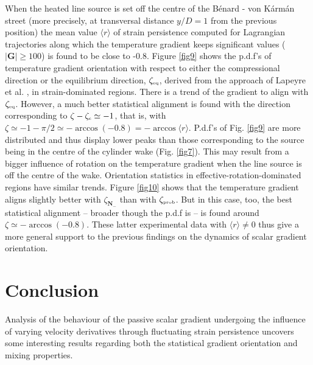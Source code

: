 \documentclass[doublespacing]{elsart}
\begin{document}
When the heated line source is set off the centre of
the B\'enard - von K\'arm\'an street (more precisely, at
transversal distance
$ y/D = 1 $ from the 
previous position) the mean value $ \langle r \rangle $ of
strain persistence computed for Lagrangian trajectories 
along which
the temperature gradient keeps significant values 
($ |\bm{G}| \geq 100 $)
is
found to be close to -0.8. 
Figure \ref{fig9} shows the p.d.f's of temperature gradient 
orientation with respect to either the compressional 
direction
or the equilibrium
direction, $ \zeta_{\mbox{\tiny eq}} $, derived from the approach
of Lapeyre et al. \cite{Lal99},
in strain-dominated regions.
There is a trend 
of the gradient
to
align with $ \zeta_{\mbox{\tiny eq}} $. However, a much better
statistical alignment is found with the direction corresponding
to $ \zeta - \zeta_{\mbox{\tiny c}} \simeq -1 $, that is, with
$ \zeta \simeq -1-\pi/2 \simeq -\arccos(-0.8) = -\arccos \langle r \rangle $.
P.d.f's of Fig. \ref{fig9} are more distributed and thus
display lower peaks than those corresponding to the source
being in the centre of the cylinder wake
(Fig. \ref{fig7}). This may result from a bigger influence of
rotation on the temperature gradient when the line source
is off the centre of the wake.       
Orientation statistics 
in effective-rotation-dominated regions 
have
similar
trends.
Figure \ref{fig10} shows that the temperature gradient aligns
slightly better with
$ \zeta_{\bm{N}_-} $ 
than with $ \zeta_{\mbox{\tiny prob}} $. 
But
in this case, too, the best statistical alignment
-- broader though the p.d.f is -- is found around
$ \zeta \simeq -\arccos(-0.8) $.
These latter experimental data with $ \langle r \rangle \neq 0 $
thus give a more 
general support to the previous findings    
on
the dynamics of
scalar gradient orientation. 
\section{Conclusion}
\label{sec5}
Analysis
of the behaviour of the passive scalar gradient
undergoing the influence of varying velocity derivatives
through fluctuating strain persistence 
uncovers some interesting results regarding both the
statistical
gradient orientation and mixing properties.
\end{document}
